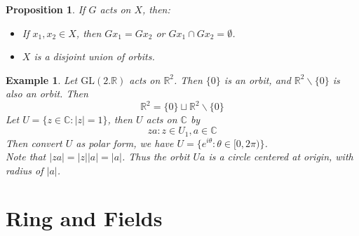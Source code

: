 \documentclass{article}
\theoremstyle{MyNonumberplain}
\theoremstyle{break}
\newcommand{\tmop}{\text}
\theoremstyle{break}
\newtheorem{proposition}{Proposition}[section]
\newtheorem{example}{Example}[section]
\theoremstyle{break}
\theoremstyle{definition}
\theoremstyle{break}
\begin{document}
\begin{thmbox}
    \begin{proposition}
        If $G$ acts on $X$, then:\\
        \begin{itemize}
        \item If $x_1, x_2 \in X$, then $G x_1 = G x_2$ or $G x_1 \cap G x_2 =
        \emptyset$.\\
        
        \item $X$ is a disjoint union of orbits.
        \end{itemize}
    \end{proposition}
\end{thmbox}

\begin{expbox}
    \begin{example}
        Let $\tmop{GL} (2.\mathbb{R})$ acts on $\mathbb{R}^2$. Then $\{ 0 \}$ is an
        orbit, and $\mathbb{R}^2 \backslash \{ 0 \}$ is also an orbit. Then
        \[ \mathbb{R}^2 = \{ 0 \} \sqcup \mathbb{R}^2 \backslash \{ 0 \} \]
        Let $U = \{ z \in \mathbb{C}: | z | = 1 \}$, then $U$ acts on $\mathbb{C}$ by
        \[ z a : z \in U_1, a \in \mathbb{C} \]
        Then convert $U$ as polar form, we have $U = \{ e^{i \theta} : \theta \in [0,
        2 \pi) \}$.\\   

        Note that $| z a | = | z |  | a | = | a |$. Thus the orbit $U a$ is a circle
        centered at origin, with radius of $| a |$.
    \end{example}
\end{expbox}

\newpage

\setcounter{section}{17}

\section{Ring and Fields}
\end{document}
